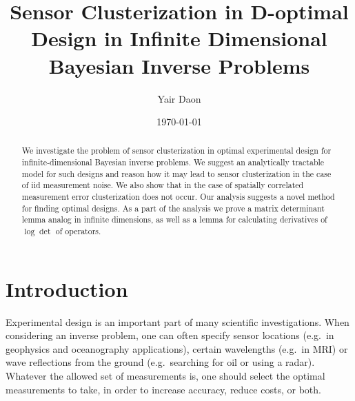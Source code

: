 \documentclass{amsart}
\numberwithin{equation}{section}
\begin{document}
\title[Sensor Clusterization in D-optimal design in infinite
  dimensions]{Sensor Clusterization in D-optimal Design in Infinite
  Dimensional Bayesian Inverse Problems}

\author{Yair Daon}
\address{Courant Institute}


\date{\today}

\begin{abstract}
  We investigate the problem of sensor clusterization in optimal
  experimental design for infinite-dimensional Bayesian inverse
  problems. We suggest an analytically tractable model for such
  designs and reason how it may lead to sensor clusterization in the
  case of iid measurement noise. We also show that in the case of
  spatially correlated measurement error clusterization does not
  occur. Our analysis suggests a novel method for finding optimal
  designs. As a part of the analysis we prove a matrix determinant
  lemma analog in infinite dimensions, as well as a lemma for
  calculating derivatives of $\log \det$ of operators.
\end{abstract}

\maketitle

\section{Introduction}\label{section:OED intro}
Experimental design is an important part of many scientific
investigations. When considering an inverse problem, one can often
specify sensor locations (e.g.\ in geophysics and oceanography
applications), certain wavelengths (e.g.\ in MRI) or wave reflections
from the ground (e.g.\ searching for oil or using a radar). Whatever
the allowed set of measurements is, one should select the optimal
measurements to take, in order to increase accuracy, reduce costs, or
both.
\end{document}
